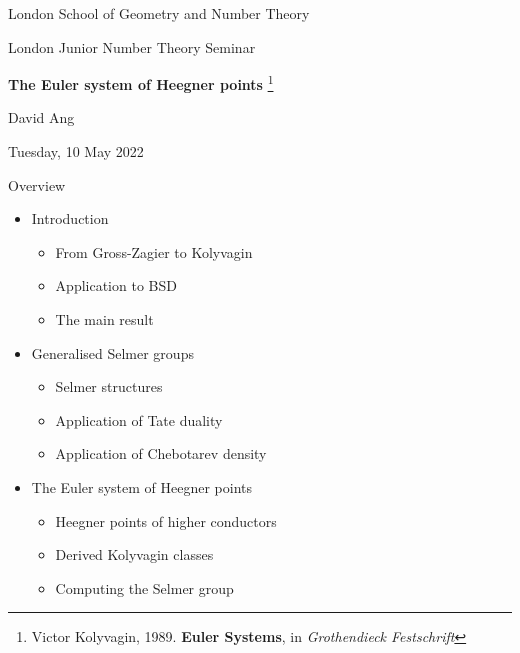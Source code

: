 \documentclass[10pt]{beamer}
\theoremstyle{definition}
\begin{document}
\begin{frame}

\begin{center}

{\scriptsize London School of Geometry and Number Theory}

\vspace{0.5cm}

{\small London Junior Number Theory Seminar}

\vspace{1cm}

\textbf{\large The Euler system of Heegner points} \footnote{\scriptsize Victor Kolyvagin, 1989. \textbf{Euler Systems}, in \emph{Grothendieck Festschrift}}

\vspace{1cm}

David Ang

\vspace{0.5cm}

{\footnotesize Tuesday, 10 May 2022}

\end{center}

\end{frame}

\begin{frame}{Overview}

\begin{itemize}
\item Introduction
\begin{itemize}
\item From Gross-Zagier to Kolyvagin
\item Application to BSD
\item The main result
\end{itemize}
\item Generalised Selmer groups
\begin{itemize}
\item Selmer structures
\item Application of Tate duality
\item Application of Chebotarev density
\end{itemize}
\item The Euler system of Heegner points
\begin{itemize}
\item Heegner points of higher conductors
\item Derived Kolyvagin classes
\item Computing the Selmer group
\end{itemize}
\end{itemize}

\end{frame}
\end{document}
